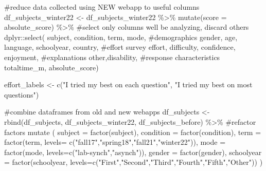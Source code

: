\documentclass[
  letterpaper,
  DIV=11,
  numbers=noendperiod]{scrreprt}
\newenvironment{Shaded}{\begin{snugshade}}{\end{snugshade}}
\newcommand{\AttributeTok}[1]{\textcolor[rgb]{0.40,0.45,0.13}{#1}}
\newcommand{\CommentTok}[1]{\textcolor[rgb]{0.37,0.37,0.37}{#1}}
\newcommand{\FunctionTok}[1]{\textcolor[rgb]{0.28,0.35,0.67}{#1}}
\newcommand{\NormalTok}[1]{\textcolor[rgb]{0.00,0.23,0.31}{#1}}
\newcommand{\OtherTok}[1]{\textcolor[rgb]{0.00,0.23,0.31}{#1}}
\newcommand{\SpecialCharTok}[1]{\textcolor[rgb]{0.37,0.37,0.37}{#1}}
\newcommand{\StringTok}[1]{\textcolor[rgb]{0.13,0.47,0.30}{#1}}
\begin{document}
\begin{Shaded}
\begin{Highlighting}[]
\CommentTok{\#reduce data collected using NEW webapp to useful columns}
\NormalTok{df\_subjects\_winter22 }\OtherTok{\textless{}{-}}\NormalTok{ df\_subjects\_winter22 }\SpecialCharTok{\%\textgreater{}\%} 
  \FunctionTok{mutate}\NormalTok{(}\AttributeTok{score =}\NormalTok{ absolute\_score) }\SpecialCharTok{\%\textgreater{}\%} 
  \CommentTok{\#select only columns we\textquotesingle{}ll be analyzing, discard others}
\NormalTok{  dplyr}\SpecialCharTok{::}\FunctionTok{select}\NormalTok{( subject, condition, term, mode, }
                 \CommentTok{\#demographics}
\NormalTok{                 gender, age, language, schoolyear, country,}
                 \CommentTok{\#effort survey}
\NormalTok{                 effort, difficulty, confidence, enjoyment, }
                 \CommentTok{\#explanations}
\NormalTok{                 other,disability,}
                 \CommentTok{\#response characteristics}
\NormalTok{                 totaltime\_m, absolute\_score)}


\NormalTok{effort\_labels }\OtherTok{\textless{}{-}} \FunctionTok{c}\NormalTok{(}\StringTok{"I tried my best on each question"}\NormalTok{, }\StringTok{"I tried my best on most questions"}\NormalTok{)}

\CommentTok{\#combine dataframes from old and new webapps}
\NormalTok{df\_subjects }\OtherTok{\textless{}{-}} \FunctionTok{rbind}\NormalTok{(df\_subjects, df\_subjects\_winter22, df\_subjects\_before) }\SpecialCharTok{\%\textgreater{}\%} 
  \CommentTok{\#refactor factors}
  \FunctionTok{mutate}\NormalTok{ (}
    \AttributeTok{subject =} \FunctionTok{factor}\NormalTok{(subject),}
    \AttributeTok{condition =} \FunctionTok{factor}\NormalTok{(condition),}
    \AttributeTok{term =} \FunctionTok{factor}\NormalTok{(term, }\AttributeTok{levels=} \FunctionTok{c}\NormalTok{(}\StringTok{"fall17"}\NormalTok{,}\StringTok{"spring18"}\NormalTok{,}\StringTok{"fall21"}\NormalTok{,}\StringTok{"winter22"}\NormalTok{)),}
    \AttributeTok{mode =} \FunctionTok{factor}\NormalTok{(mode, }\AttributeTok{levels=}\FunctionTok{c}\NormalTok{(}\StringTok{"lab{-}synch"}\NormalTok{,}\StringTok{"asynch"}\NormalTok{)),}
    \AttributeTok{gender =} \FunctionTok{factor}\NormalTok{(gender),}
    \AttributeTok{schoolyear =} \FunctionTok{factor}\NormalTok{(schoolyear, }\AttributeTok{levels=}\FunctionTok{c}\NormalTok{(}\StringTok{"First"}\NormalTok{,}\StringTok{"Second"}\NormalTok{,}\StringTok{"Third"}\NormalTok{,}\StringTok{"Fourth"}\NormalTok{,}\StringTok{"Fifth"}\NormalTok{,}\StringTok{"Other"}\NormalTok{))}
\NormalTok{  )}


\end{Highlighting}
\end{Shaded}
\end{document}
